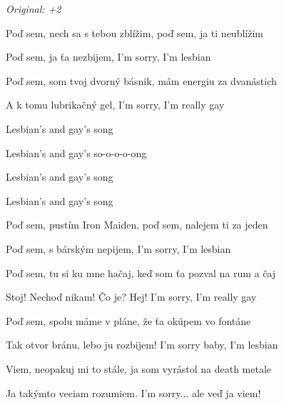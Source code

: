 \begin{song}


\begin{headerbox}
 \quad
\textit{Original: +2}
\end{headerbox}

\begin{hchordbox}
\end{hchordbox}

\Large

\bigskip

 Poď sem, nech sa s tebou zblížim,  poď sem, ja ti neublížim \par
{} Poď sem, ja ťa nezbijem,  I'm sorry, I'm lesbian \par
{} Poď sem, som tvoj dvorný básnik,  mám energiu za dvanástich \par
{} A k tomu lubrikačný gel,  I'm sorry, I'm really gay \par

\bigskip

\begin{chorusbox}{\Refren}
Lesbian's and gay's song \par
{}Lesbian's and gay's so-o-o-o-ong \par
{}Lesbian's and gay's song \par
{}Lesbian's and gay's song \par
\end{chorusbox}

\bigskip

 Poď sem, pustím Iron Maiden,  poď sem, nalejem ti za jeden \par
{} Poď sem, s bárským nepijem,  I'm sorry, I'm lesbian \par
{} Poď sem, tu si ku mne hačaj,  keď som ťa pozval na rum a čaj \par
{} Stoj! Nechoď nikam! Čo je? Hej!  I'm sorry, I'm really gay \par

\bigskip

\Refren

\bigskip

 Poď sem, spolu máme v pláne,  že ťa okúpem vo fontáne \par
{} Tak otvor bránu, lebo ju rozbijem!  I'm sorry baby, I'm lesbian \par
{} Viem, neopakuj mi to stále,  ja som vyrástol na death metale \par
{} Ja takýmto veciam rozumiem.  I'm sorry... ale veď ja viem! \par

\bigskip

\Refren

\end{song}